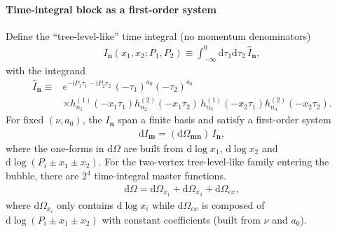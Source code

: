 \documentclass[a4paper,12pt]{article}
\def\di{{\mathrm{d}}}
\def\ii{\mathrm{i}}
\begin{document}
\paragraph{Time-integral block as a first-order system}
Define the ``tree-level-like'' time integral (no momentum denominators)
\begin{align}
	I_{\bm n}(x_1,x_2;P_1,P_2)\equiv \int_{-\infty}^0 \di\tau_1\di\tau_2\,\hat{I}_{\bm n},
\end{align}
with the integrand
\begin{align}
	\hat{I}_{\bm n} \equiv & e^{-\ii P_1\tau_1-\ii P_2\tau_2}\,(-\tau_1)^{a_0}(-\tau_2)^{a_0} \nonumber\\
	&\times h_{n_1}^{(1)}(-x_1\tau_1)h_{n_2}^{(2)}(-x_1\tau_2)\,h_{n_3}^{(1)}(-x_2\tau_1)h_{n_4}^{(2)}(-x_2\tau_2).
\end{align}
For fixed $(\nu,a_0)$, the $I_{\bm n}$ span a finite basis and satisfy a first-order system
\begin{align}
	\di I_{\bm m}=(\di\Omega_{\bm m\bm n})\,I_{\bm n},
\end{align}
where the one-forms in $\di\Omega$ are built from $\di\log x_1$, $\di\log x_2$ and $\di\log(P_i\pm x_1\pm x_2)$.
For the two-vertex tree-level-like family entering the bubble, there are $2^4$ time-integral master functions.
\begin{align}
	\di\Omega=\di\Omega_{x_1}+\di\Omega_{x_2}+\di\Omega_{ex},
\end{align}
where $\di\Omega_{x_i}$ only contains $\di\log x_i$ while $\di\Omega_{ex}$ is composed of $\di\log(P_i\pm x_1\pm x_2)$ with constant coefficients (built from $\nu$ and $a_0$).
\end{document}
